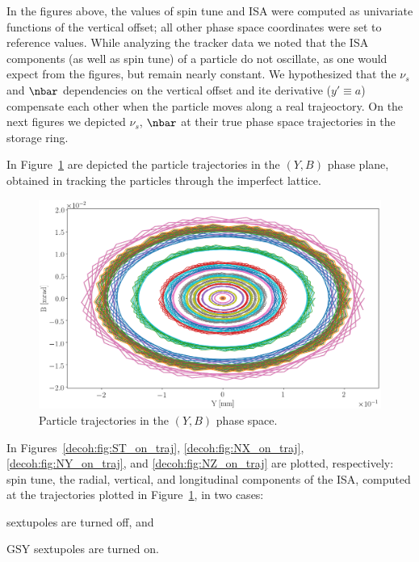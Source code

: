 In the figures above, the values of spin tune and ISA were computed as univariate functions
of the vertical offset; all other phase space coordinates were set to reference values. While analyzing
the tracker data we noted that the ISA components (as well as spin tune) of a particle do not oscillate,
as one would expect from the figures, but remain nearly constant. We hypothesized that the $\nu_s$ and $\nbar$
dependencies on the vertical offset and ite derivative ($y'\equiv a$) compensate each other when the particle
moves along a real trajeoctory. On the next figures we depicted $\nu_s$, $\nbar$ at their true phase space
trajectories in the storage ring.

In Figure~\ref{decoh:fig:yb_traj} are depicted the particle trajectories in the $(Y,B)$ phase plane,
obtained in tracking the particles through the imperfect lattice.
\begin{figure}[h!]
	\centering
	\includegraphics[width=\linewidth]{images/decoh_sim/YB-PHASE_SPACE_IMPERFECT_UNOPT}
	\caption{Particle trajectories in the $(Y,B)$ phase space.\label{decoh:fig:yb_traj}} 
\end{figure}

In Figures~\ref{decoh:fig:ST_on_traj}, \ref{decoh:fig:NX_on_traj}, \ref{decoh:fig:NY_on_traj}, and
\ref{decoh:fig:NZ_on_traj} are plotted, respectively: spin tune, the radial, vertical, and longitudinal
components of the ISA, computed at the trajectories plotted in Figure~\ref{decoh:fig:yb_traj}, in two cases:
\begin{enumerate*}
	\item sextupoles are turned off, and 
	\item GSY sextupoles are turned on.
\end{enumerate*}  

